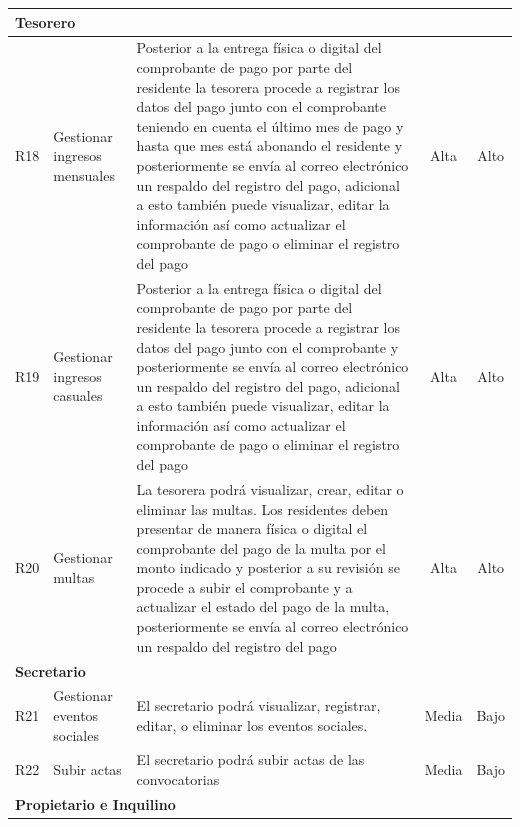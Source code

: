 \begin{footnotesize}
\begin{spacing}{1}
\begin{center}
\begin{longtable}[l]{|p{}|p{}|p{}|p{}| p{}|}
            \multicolumn{5}{|l|}{ \textbf{Tesorero} } \\
            \hline
            R18         & Gestionar ingresos mensuales                      & Posterior a la entrega física o digital del comprobante de pago por parte del residente la tesorera procede a registrar los datos del pago junto con el comprobante teniendo en cuenta el último mes de pago y hasta que mes está abonando el residente y posteriormente se envía al correo electrónico un respaldo del registro del pago, adicional a esto también puede visualizar, editar la información así como actualizar el comprobante de pago o eliminar el registro del pago & \multicolumn{1}{c|}{Alta} & \multicolumn{1}{c|}{Alto}\\
            \hline
            R19         & Gestionar ingresos casuales                       & Posterior a la entrega física o digital del comprobante de pago por parte del residente la tesorera procede a registrar los datos del pago junto con el comprobante y posteriormente se envía al correo electrónico un respaldo del registro del pago, adicional a esto también puede visualizar, editar la información así como actualizar el comprobante de pago o eliminar el registro del pago & \multicolumn{1}{c|}{Alta} & \multicolumn{1}{c|}{Alto}\\
            \hline
            R20 & Gestionar multas & La tesorera podrá visualizar, crear, editar o eliminar las multas.
            Los residentes deben presentar de manera física o digital el comprobante del pago de la multa por el monto indicado y posterior a su revisión se procede a subir el comprobante y a actualizar el estado del pago de la multa, posteriormente se envía al correo electrónico un respaldo del registro del pago & \multicolumn{1}{c|}{Alta}  & \multicolumn{1}{c|}{Alto}\\
            \hline
            \multicolumn{5}{|l|}{ \textbf{Secretario} } \\
            \hline
            R21         & Gestionar eventos sociales                        & El secretario podrá visualizar, registrar, editar, o eliminar los eventos sociales. & \multicolumn{1}{c|}{Media} & \multicolumn{1}{c|}{Bajo}\\
            \hline
            R22         & Subir actas                           & El secretario podrá subir actas de las convocatorias & \multicolumn{1}{c|}{Media} & \multicolumn{1}{c|}{Bajo}\\
            \hline
            \multicolumn{5}{|l|}{ \textbf{Propietario e Inquilino} } \\

\end{longtable}
\end{center}
\end{spacing}
\end{footnotesize}
